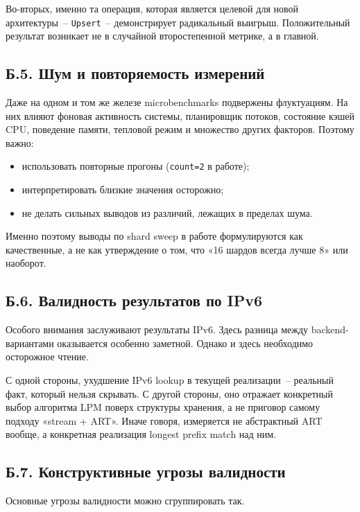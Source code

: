 Во-вторых, именно та операция, которая является целевой для новой
архитектуры~-- \texttt{Upsert}~-- демонстрирует радикальный выигрыш.
Положительный результат возникает не в случайной второстепенной
метрике, а в главной.

\subsection*{Б.5. Шум и повторяемость измерений}

Даже на одном и том же железе microbenchmarks подвержены
флуктуациям. На них влияют фоновая активность системы, планировщик
потоков, состояние кэшей CPU, поведение памяти, тепловой режим и
множество других факторов. Поэтому важно:

\begin{itemize}
\item использовать повторные прогоны (\texttt{count=2} в работе);
\item интерпретировать близкие значения осторожно;
\item не делать сильных выводов из различий, лежащих в пределах
шума.
\end{itemize}

Именно поэтому выводы по shard sweep в работе формулируются как
качественные, а не как утверждение о том, что «16 шардов всегда
лучше 8» или наоборот.

\subsection*{Б.6. Валидность результатов по IPv6}

Особого внимания заслуживают результаты IPv6. Здесь разница между
backend-вариантами оказывается особенно заметной. Однако и здесь
необходимо осторожное чтение.

С одной стороны, ухудшение IPv6 lookup в текущей реализации~--
реальный факт, который нельзя скрывать. С другой стороны, оно
отражает конкретный выбор алгоритма LPM поверх структуры хранения, а
не приговор самому подходу «stream + ART». Иначе говоря, измеряется
не абстрактный ART вообще, а конкретная реализация longest prefix
match над ним.

\subsection*{Б.7. Конструктивные угрозы валидности}

Основные угрозы валидности можно сгруппировать так.

